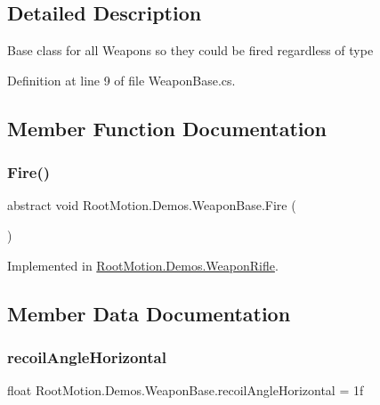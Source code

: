 \subsection{Detailed Description}
Base class for all Weapons so they could be fired regardless of type 



Definition at line 9 of file Weapon\+Base.\+cs.



\subsection{Member Function Documentation}
\mbox{\label{class_root_motion_1_1_demos_1_1_weapon_base_ae0c2eda9d6c7f249bc08d670fb9dd7ff}} 
\subsubsection{\texorpdfstring{Fire()}{Fire()}}
{\footnotesize\ttfamily abstract void Root\+Motion.\+Demos.\+Weapon\+Base.\+Fire (\begin{DoxyParamCaption}{ }\end{DoxyParamCaption})\hspace{0.3cm}{\ttfamily [pure virtual]}}



Implemented in \mbox{\hyperlink{class_root_motion_1_1_demos_1_1_weapon_rifle_addde8b0d4aa215578c749c96c58b702c}{Root\+Motion.\+Demos.\+Weapon\+Rifle}}.



\subsection{Member Data Documentation}
\mbox{\label{class_root_motion_1_1_demos_1_1_weapon_base_ab1ec81cb984557cbc299684a71d72fd9}} 
\subsubsection{\texorpdfstring{recoil\+Angle\+Horizontal}{recoilAngleHorizontal}}
{\footnotesize\ttfamily float Root\+Motion.\+Demos.\+Weapon\+Base.\+recoil\+Angle\+Horizontal = 1f}



